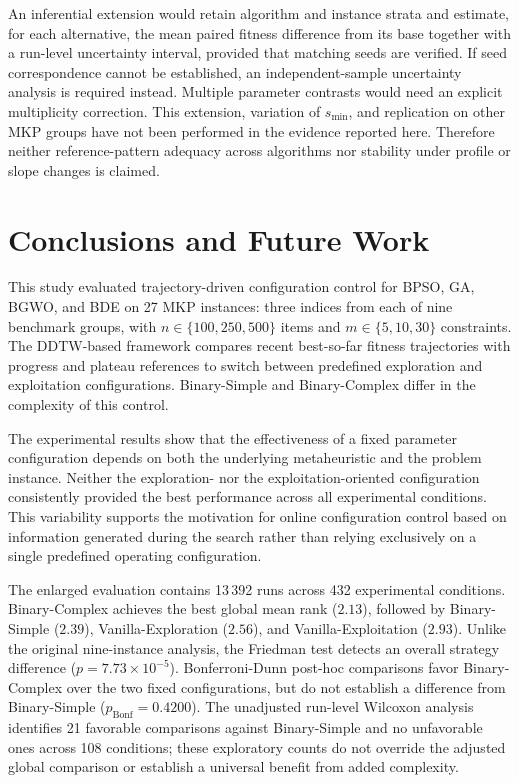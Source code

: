 \documentclass[journal,article,submit,moreauthors]{Definitions/mdpi}
\begin{document}
An inferential extension would retain algorithm and instance strata and
estimate, for each alternative, the mean paired fitness difference from its
base together with a run-level uncertainty interval, provided that matching
seeds are verified. If seed correspondence cannot be established, an
independent-sample uncertainty analysis is required instead. Multiple
parameter contrasts would need an explicit multiplicity correction.
This extension, variation of $s_{\min}$, and replication on other MKP groups
have not been performed in the evidence reported here. Therefore neither
reference-pattern adequacy across algorithms nor stability under profile
or slope changes is claimed.


\section{Conclusions and Future Work}
\label{sec:conclusions}

This study evaluated trajectory-driven configuration control for BPSO,
GA, BGWO, and BDE on 27 MKP instances: three indices from each of nine
benchmark groups, with $n\in\{100,250,500\}$ items and
$m\in\{5,10,30\}$ constraints. The DDTW-based framework compares recent
best-so-far fitness trajectories with progress and plateau references to
switch between predefined exploration and exploitation configurations.
Binary-Simple and Binary-Complex differ in the complexity of this control.

The experimental results show that the effectiveness of a fixed parameter
configuration depends on both the underlying metaheuristic and the problem
instance. Neither the exploration- nor the exploitation-oriented
configuration consistently provided the best performance across all
experimental conditions. This variability supports the motivation for
online configuration control based on information generated during the
search rather than relying exclusively on a single predefined operating
configuration.

The enlarged evaluation contains 13\,392 runs across 432 experimental
conditions. Binary-Complex achieves the best global mean rank ($2.13$),
followed by Binary-Simple ($2.39$), Vanilla-Exploration ($2.56$), and
Vanilla-Exploitation ($2.93$). Unlike the original nine-instance analysis,
the Friedman test detects an overall strategy difference
($p=7.73\times10^{-5}$). Bonferroni-Dunn post-hoc comparisons favor
Binary-Complex over the two fixed configurations, but do not establish a
difference from Binary-Simple ($p_{\mathrm{Bonf}}=0.4200$).
The unadjusted run-level Wilcoxon analysis identifies 21 favorable
comparisons against Binary-Simple and no unfavorable ones across 108
conditions; these exploratory counts do not override the adjusted
global comparison or establish a universal benefit from added complexity.
\end{document}
